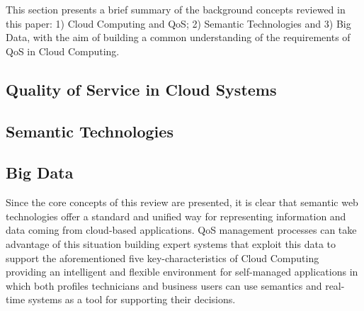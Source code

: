 This section presents a brief summary of the background concepts reviewed in this paper: 
1) Cloud Computing and QoS; 2) Semantic Technologies and 3) Big Data, with the 
aim of building a common understanding of the requirements of QoS in Cloud Computing.


\subsection{Quality of Service in Cloud Systems}\label{qos-cloud-index}

\subsection{Semantic Technologies}

\subsection{Big Data}


Since the core concepts of this review are presented, it is clear that semantic 
web technologies offer a standard and unified way for representing information 
and data coming from cloud-based applications. QoS management processes can 
take advantage of this situation building expert systems that exploit this data to support the aforementioned five 
key-characteristics of Cloud Computing providing an intelligent and flexible environment for 
self-managed applications in which both profiles technicians and business users can use 
semantics and real-time systems as a tool for supporting their decisions.
